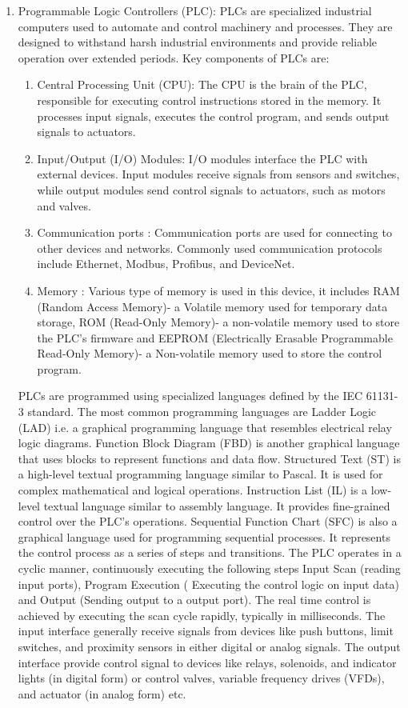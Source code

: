 \begin{enumerate}
   \item Programmable Logic Controllers (PLC): PLCs are specialized industrial computers used to automate and control machinery and processes. They are designed to withstand harsh industrial environments and provide reliable operation over extended periods. Key components of PLCs are: 
     \begin{enumerate}
         \item Central Processing Unit (CPU): The CPU is the brain of the PLC, responsible for executing control instructions stored in the memory. It processes input signals, executes the control program, and sends output signals to actuators.
         \item Input/Output (I/O) Modules:  I/O modules interface the PLC with external devices. Input modules receive signals from sensors and switches, while output modules send control signals to actuators, such as motors and valves.
         \item Communication ports : Communication ports are used for connecting to other devices and networks. Commonly used communication protocols include Ethernet, Modbus, Profibus, and DeviceNet.
         \item Memory : Various type of memory is used in this device, it includes RAM (Random Access Memory)- a Volatile memory used for temporary data storage, ROM (Read-Only Memory)- a non-volatile memory used to store the PLC's firmware and EEPROM (Electrically Erasable Programmable Read-Only Memory)- a Non-volatile memory used to store the control program.
     \end{enumerate}
     PLCs are programmed using specialized languages defined by the IEC 61131-3 standard.  The most common programming languages are Ladder Logic (LAD) i.e. a graphical programming language that resembles electrical relay logic diagrams. Function Block Diagram (FBD) is another graphical language that uses blocks to represent functions and data flow. Structured Text (ST) is a high-level textual programming language similar to Pascal. It is used for complex mathematical and logical operations. Instruction List (IL) is a low-level textual language similar to assembly language. It provides fine-grained control over the PLC's operations. Sequential Function Chart (SFC) is also a graphical language used for programming sequential processes. It represents the control process as a series of steps and transitions. The PLC operates in a cyclic manner, continuously executing the following steps Input Scan (reading input ports), Program Execution ( Executing the control logic on input data) and Output (Sending output to a output port). The real time control is achieved by executing the scan cycle rapidly, typically in milliseconds. The input interface generally receive signals from devices like push buttons, limit switches, and proximity sensors in either digital or analog signals. The output interface provide control signal to devices like relays, solenoids, and indicator lights (in digital form) or control valves, variable frequency drives (VFDs), and actuator (in analog form) etc. 
     

\end{enumerate}
